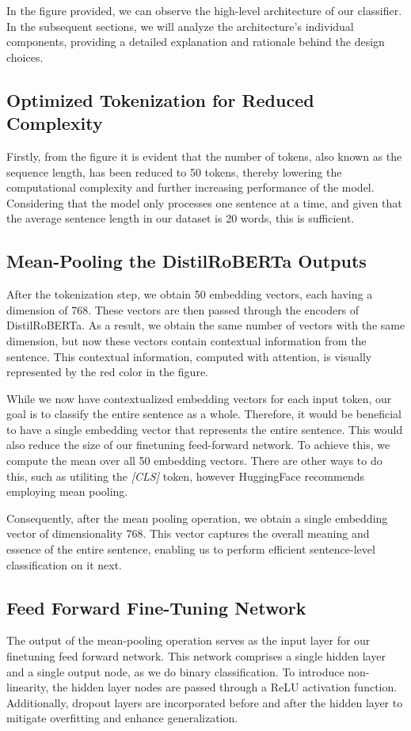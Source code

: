 \documentclass[a4paper,10pt]{report} %
\begin{document}
In the figure provided, we can observe the high-level architecture of our classifier. In the subsequent sections, we will analyze the architecture's individual components, providing a detailed explanation and rationale behind the design choices.

\subsection{Optimized Tokenization for Reduced Complexity}
Firstly, from the figure it is evident that the number of tokens, also known as the sequence length, has been reduced to 50 tokens, thereby lowering the computational complexity and further increasing performance of the model. Considering that the model only processes one sentence at a time, and given that the average sentence length in our dataset is 20 words, this is sufficient.

\subsection{Mean-Pooling the DistilRoBERTa Outputs}
After the tokenization step, we obtain 50 embedding vectors, each having a dimension of 768. These vectors are then passed through the encoders of DistilRoBERTa. As a result, we obtain the same number of vectors with the same dimension, but now these vectors contain contextual information from the sentence. This contextual information, computed with attention, is visually represented by the red color in the figure.

While we now have contextualized embedding vectors for each input token, our goal is to classify the entire sentence as a whole. Therefore, it would be beneficial to have a single embedding vector that represents the entire sentence. This would also reduce the size of our finetuning feed-forward network. To achieve this, we compute the mean over all 50 embedding vectors. There are other ways to do this, such as utiliting the \textit{[CLS]} token, however HuggingFace recommends employing mean pooling. %

Consequently, after the mean pooling operation, we obtain a single embedding vector of dimensionality 768. This vector captures the overall meaning and essence of the entire sentence, enabling us to perform efficient sentence-level classification on it next.

\subsection{Feed Forward Fine-Tuning Network}
The output of the mean-pooling operation serves as the input layer for our finetuning feed forward network. This network comprises a single hidden layer and a single output node, as we do binary classification. To introduce non-linearity, the hidden layer nodes are passed through a ReLU activation function. Additionally, dropout layers are incorporated before and after the hidden layer to mitigate overfitting and enhance generalization.
\end{document}
